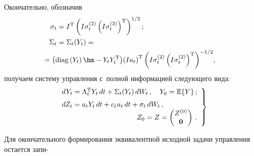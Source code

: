 \begin{multicols}{2}
     Окончательно, обозначив 
     \begin{align*}
          \sigma_t&= I^{\mathrm{T}}\left( I\sigma_t^{(2)} \left( 
I\sigma_t^{(2)}\right)^{\mathrm{T}}\right)^{1/2};\\
\Sigma_t&= \Sigma_t(Y_t) ={}\\
&\hspace*{-7mm} {}=
\left( \mathrm{diag}\left(Y_t\right) \hm-Y_tY_t^{\mathrm{T}}\right)\! \left(I a_t\right)^{\mathrm{T}} \left( 
I\sigma_t^{(2)}\left( I\sigma_t^{(2)}\right)^{\mathrm{T}}\right)^{-1/2}\!,
\end{align*}
 получаем систему 
управления с~полной информацией следующего вида:
     \begin{equation}
     \left.
     \begin{array}{l}
     dY_t=\Lambda_t^{\mathrm{T}} Y_t\,dt+\Sigma_t(Y_t)\,dW_t\,,\quad 
Y_0=\mathbb{E}\{Y\}\,;\\[6pt]
     dZ_t= a_tY_t \,dt+c_t u_t \,dt+ \sigma_t \,dW_t\,,\\ 
\hspace*{37mm}Z_0=Z=\begin{pmatrix}
     Z^{(0)}\\ \mathbf{0}
     \end{pmatrix}\,.
     \end{array}
     \right\}
     \label{e10-bos}
     \end{equation}
     
     Для окончательного формирования эквивалентной исходной задачи 
управления остается запи-\linebreak\vspace*{-12pt}

\columnbreak


\end{multicols}

